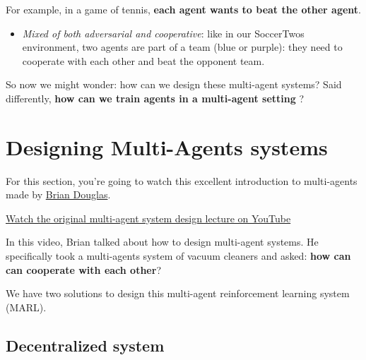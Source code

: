 \documentclass[11pt,a4paper]{article}
\begin{document}
For example, in a game of tennis, \textbf{each agent wants to beat the other agent}.


\begin{itemize}
\tightlist
\item
  \emph{Mixed of both adversarial and cooperative}: like in our SoccerTwos environment, two agents are part of a team (blue or purple): they need to cooperate with each other and beat the opponent team.
\end{itemize}


So now we might wonder: how can we design these multi-agent systems? Said differently, \textbf{how can we train agents in a multi-agent setting} ?

\section{Designing Multi-Agents systems}\label{designing-multi-agents-systems}

For this section, you're going to watch this excellent introduction to multi-agents made by \href{https://www.youtube.com/channel/UCq0imsn84ShAe9PBOFnoIrg}{Brian Douglas}.

\href{https://www.youtube.com/watch?v=qgb0gyrpiGk}{Watch the original multi-agent system design lecture on YouTube}

In this video, Brian talked about how to design multi-agent systems. He specifically took a multi-agents system of vacuum cleaners and asked: \textbf{how can can cooperate with each other}?

We have two solutions to design this multi-agent reinforcement learning system (MARL).

\subsection{Decentralized system}\label{decentralized-system}

\end{document}
